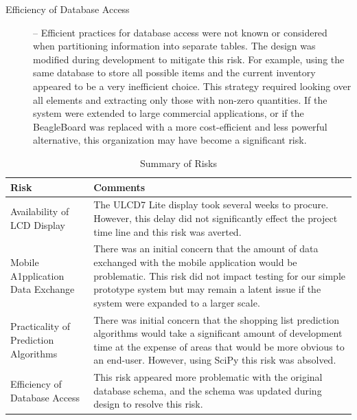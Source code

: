 \documentclass[11pt]{article} %
\begin{document}
\begin{description}
\item[Efficiency of Database Access] -- Efficient practices for database access were not known or considered when partitioning information into separate tables. The design was modified during development to mitigate this risk. For example, using the same database to store all possible items and the current inventory appeared to be a very inefficient choice. This strategy required looking over all elements and extracting only those with non-zero quantities. If the system were extended to large commercial applications, or if the BeagleBoard was replaced with a more cost-efficient and less powerful alternative, this organization may have become a significant risk.
\end{description}

\begin{table}[h!]
\caption{Summary of Risks}
\label{tab:risksum}
\begin{center}
\begin{tabular}{|p{3cm}|p{12cm}|}
\hline
Risk & Comments \\
\hline
Availability of \newline LCD Display & The ULCD7 Lite display took several weeks to procure. However, this delay did not significantly effect the project time line and this risk was averted. \\
\hline
Mobile \newline A1pplication Data Exchange & There was an initial concern that the amount of data exchanged with the mobile application would be problematic. This risk did not impact testing for our simple prototype system but may remain a latent issue if the system were expanded to a larger scale. \\
\hline
Practicality of \newline Prediction Algorithms & There was initial concern that the shopping list prediction algorithms would take a significant amount of development time at the expense of areas that would be more obvious to an end-user. However, using SciPy this risk was absolved. \\
\hline
Efficiency of \newline Database Access & This risk appeared more problematic with the original database schema, and the schema was updated during design to resolve this risk. \\
\hline
\end{tabular}
\end{center}
\
\end{table}
\end{document}
